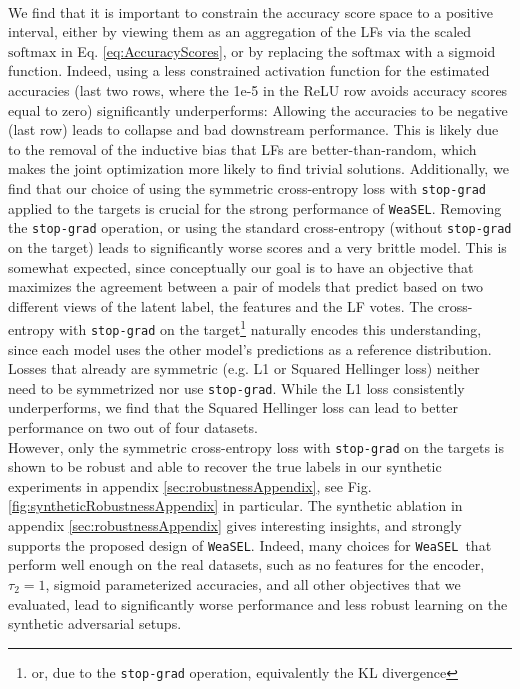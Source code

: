 \documentclass{article}
\newcommand{\softmax}{\mathrm{softmax}}
\newcommand{\weasel}{\texttt{WeaSEL}}\newcommand{\brackets}[1]{\left( #1 \right)}
\begin{document}
\\
We find that it is important to constrain the accuracy score space to a positive interval, either by viewing them as an aggregation of the LFs via the scaled $\softmax$ in Eq. \ref{eq:AccuracyScores}, or by replacing the $\softmax$ with a sigmoid function. Indeed, using a less constrained activation function for the estimated accuracies (last two rows, where the 1e-5 in the ReLU row avoids accuracy scores equal to zero) significantly underperforms:
Allowing the accuracies to be negative (last row) leads to collapse and bad downstream performance. This is likely due to the removal of the inductive bias that LFs are better-than-random, which makes the joint optimization more likely to find trivial solutions.
Additionally, we find that our choice of using the symmetric cross-entropy loss with \texttt{stop-grad} applied to the targets is  crucial for the strong performance of \weasel. Removing the \texttt{stop-grad} operation, or using the standard cross-entropy (without \texttt{stop-grad} on the target) leads to significantly worse scores and a very brittle model. This is somewhat expected, since conceptually our goal is to have an objective that maximizes the agreement between a pair of models that predict based on two different views of the latent label, the features and the LF votes. The cross-entropy with \texttt{stop-grad} on the target\footnote{or, due to the \texttt{stop-grad} operation, equivalently the KL divergence} naturally encodes this understanding, since each model uses the other model's predictions as a reference distribution. 
Losses that already are symmetric (e.g. L1 or Squared Hellinger loss) neither need to be symmetrized nor use \texttt{stop-grad}. While the L1 loss consistently underperforms, we find that the Squared Hellinger loss can lead to better performance on two out of four datasets.
\\
However, only the symmetric cross-entropy loss with \texttt{stop-grad} on the targets is shown to be robust and able to recover the true labels in our synthetic experiments in appendix \ref{sec:robustnessAppendix}, see Fig. \ref{fig:syntheticRobustnessAppendix} in particular. 
The synthetic ablation in appendix \ref{sec:robustnessAppendix} gives interesting insights, and strongly supports the proposed design of \weasel. Indeed, many choices for \weasel\ that perform well enough on the real datasets, such as no features for the encoder, $\tau_2 = 1$, sigmoid parameterized accuracies, and all other objectives that we evaluated, lead to significantly worse performance and less robust learning on the synthetic adversarial setups.
\end{document}
